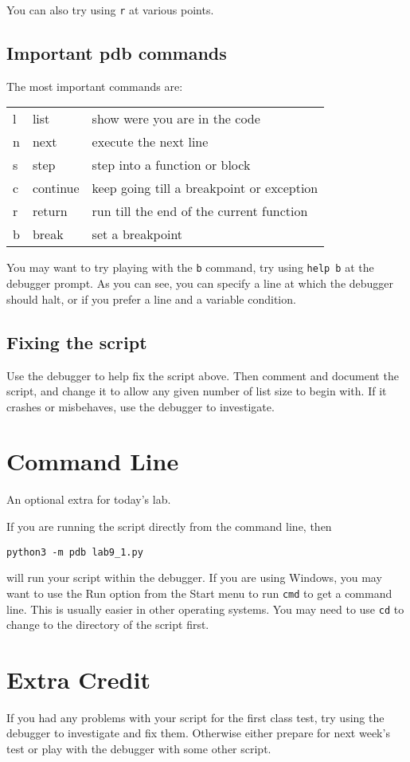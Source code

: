 \documentclass[12pt,oneside]{cttutorial}
\begin{document}
You can also try using \lstinline!r! at various points.

\subsection{Important pdb commands}

The most important commands are:

\begin{tabular}{lll}
l & list & show were you are in the code \\
n & next & execute the next line \\
s & step & step into a function or block \\
c & continue & keep going till a breakpoint or exception \\
r & return & run till the end of the current function \\
b & break & set a breakpoint \\
\end{tabular}

You may want to try playing with the \lstinline!b! command, try using \lstinline!help b! at the debugger prompt. As you can see, you can specify a line at which the debugger should halt, or if you prefer a line and a variable condition.

\subsection{Fixing the script}

Use the debugger to help fix the script above. Then comment and document the script, and change it to allow any given number of list size to begin with. If it crashes or misbehaves, use the debugger to investigate.

\section{Command Line}

An optional extra for today's lab.

If you are running the script directly from the command line, then

\begin{lstlisting}
python3 -m pdb lab9_1.py
\end{lstlisting}

will run your script within the debugger. If you are using Windows, you may want to use the Run option from the Start menu to run \lstinline!cmd! to get a command line. This is usually easier in other operating systems. You may need to use \lstinline!cd! to change to the directory of the script first.

\section{Extra Credit}

If you had any problems with your script for the first class test, try using the debugger to investigate and fix them. Otherwise either prepare for next week's test or play with the debugger with some other script.
\end{document}

